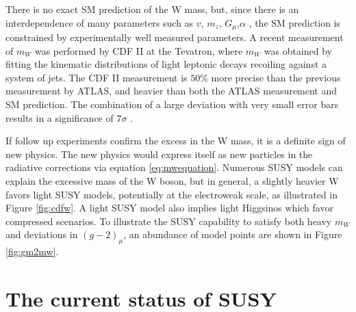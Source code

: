 There is no exact SM prediction of the W mass, but, since there is an interdependence of many parameters such as $v$, $m_z$, $G_\mu$,$\alpha$ , the SM prediction is constrained by experimentally well measured parameters. A recent measurement of $m_W$ was performed by CDF II at the Tevatron, where $m_W$ was obtained by fitting the kinematic distributions of light leptonic decays recoiling against a system of jets. The CDF II measurement is $50\%$ more precise than the previous measurement by ATLAS, and heavier than both the ATLAS measurement and SM prediction. The combination of a large deviation with very small error bars results in a significance of $7\sigma$ \cite{CDF:2022hxs}.  

If follow up experiments confirm the excess in the W mass, it is a definite sign of new physics. The new physics would express itself as new particles in the radiative corrections via equation \ref{eq:mwequation}. Numerous SUSY models can explain the excessive mass of the W boson, but in general, a slightly heavier W favors light SUSY models, potentially at the electroweak scale, as illustrated in Figure \ref{fig:cdfw}. A light SUSY model also implies light Higgsinos which favor compressed scenarios.  To illustrate the SUSY capability to satisfy both heavy $m_W$ and deviations in $(g-2)_\mu$, an abundance of model points are shown in Figure \ref{fig:gm2mw}.
\section{The current status of SUSY}

